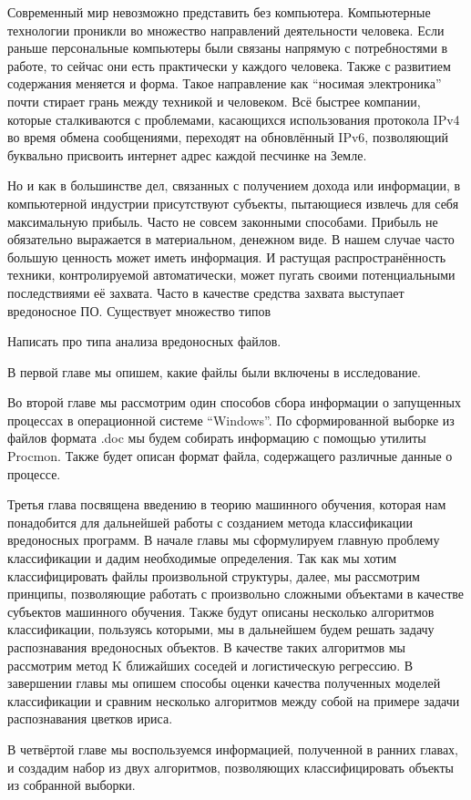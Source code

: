 
Современный мир невозможно представить без компьютера. Компьютерные технологии проникли во множество направлений деятельности человека. Если раньше персональные компьютеры были связаны напрямую с потребностями в работе, то сейчас они есть практически у каждого человека. Также с развитием содержания меняется и форма. Такое направление как “носимая электроника” почти стирает грань между техникой и человеком. Всё быстрее компании, которые сталкиваются с проблемами, касающихся использования протокола IPv4 во время обмена сообщениями, переходят на обновлённый IPv6, позволяющий буквально присвоить интернет адрес каждой песчинке на Земле.

Но и как в большинстве дел, связанных с получением дохода или информации, в компьютерной индустрии присутствуют субъекты, пытающиеся извлечь для себя максимальную прибыль. Часто не совсем законными способами. Прибыль не обязательно выражается в материальном, денежном виде. В нашем случае часто большую ценность может иметь информация. И растущая распространённость техники, контролируемой автоматически, может пугать своими потенциальными последствиями её захвата. Часто в качестве средства захвата выступает вредоносное ПО. Существует 
множество типов

Написать про типа анализа вредоносных файлов.

В первой главе мы опишем, какие файлы были включены в исследование.

Во второй главе мы рассмотрим один способов сбора информации о запущенных процессах в операционной системе “Windows”.  По сформированной выборке из файлов формата .doc мы будем собирать информацию с помощью утилиты Procmon. Также будет описан формат файла, содержащего различные данные о процессе.

Третья глава посвящена введению в теорию машинного обучения, которая нам понадобится для дальнейшей работы с созданием метода классификации вредоносных программ. В начале главы мы сформулируем главную проблему классификации и дадим необходимые определения. Так как мы хотим классифицировать файлы произвольной структуры, далее, мы рассмотрим принципы, позволяющие работать с произвольно сложными объектами в качестве субъектов машинного обучения. Также будут описаны несколько алгоритмов классификации, пользуясь которыми, мы в дальнейшем будем решать задачу распознавания вредоносных объектов. В качестве таких алгоритмов мы рассмотрим метод K ближайших соседей и логистическую регрессию.  В завершении главы мы опишем способы оценки качества полученных моделей классификации и сравним несколько алгоритмов между собой на примере задачи распознавания цветков ириса.

В четвёртой главе мы воспользуемся информацией, полученной в ранних главах, и создадим набор из двух алгоритмов, позволяющих классифицировать объекты из собранной выборки.
